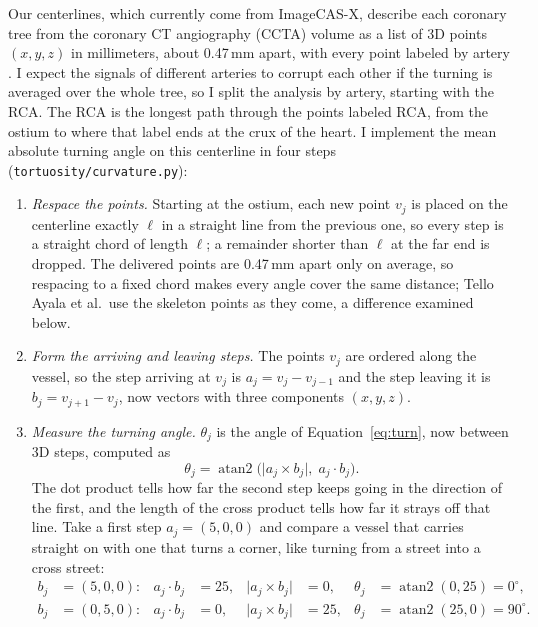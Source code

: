 \noindent Our centerlines, which currently come from ImageCAS-X, describe each coronary tree from the coronary
CT angiography (CCTA) volume as a list of 3D points $(x, y, z)$ in millimeters, about 0.47\,mm apart,
with every point labeled by artery \cite{bransby2026imagecasx}.
I expect the signals of different arteries to corrupt each other if the turning is averaged over
the whole tree, so I split the analysis by artery, starting with the RCA.
The RCA is the longest path through the points labeled RCA, from the ostium to where that label ends
at the crux of the heart.
I implement the mean absolute turning angle on this centerline in four steps
(\texttt{tortuosity/curvature.py}):
\begin{enumerate}
  \item \emph{Respace the points.}
    Starting at the ostium, each new point $v_j$ is placed on the centerline exactly $\ell$
    in a straight line from the previous one, so every step is a straight chord of length $\ell$; a
    remainder shorter than $\ell$ at the far end is dropped.
    The delivered points are 0.47\,mm apart only on average, so respacing to a fixed chord makes
    every angle cover the same distance; Tello Ayala et al.\ use the skeleton points as they come, a
    difference examined below.
  \item \emph{Form the arriving and leaving steps.}
    The points $v_j$ are ordered along the vessel, so the step arriving at $v_j$ is
    $a_j = v_j - v_{j-1}$ and the step leaving it is $b_j = v_{j+1} - v_j$, now vectors with three
    components $(x, y, z)$.
  \item \emph{Measure the turning angle.}
    $\theta_j$ is the angle of Equation~\eqref{eq:turn}, now between 3D steps, computed as
    \begin{equation}
      \theta_j = \operatorname{atan2}\bigl(\lvert a_j \times b_j\rvert,\; a_j \cdot b_j\bigr).
      \label{eq:atan2}
    \end{equation}
    The dot product tells how far the second step keeps going in the direction of the first, and the length of the cross product tells how far it strays off that line.
    Take a first step $a_j = (5,0,0)$ and compare a vessel that carries straight on with one that turns a corner, like turning from a street into a cross street:
    \begin{align*}
      b_j &= (5,0,0): & a_j \cdot b_j &= 25, & \lvert a_j \times b_j\rvert &= 0, & \theta_j &= \operatorname{atan2}(0, 25) = 0^\circ, \\
      b_j &= (0,5,0): & a_j \cdot b_j &= 0,  & \lvert a_j \times b_j\rvert &= 25, & \theta_j &= \operatorname{atan2}(25, 0) = 90^\circ.

\end{align*}
\end{enumerate}
